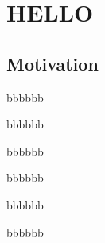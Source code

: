 \documentclass[11pt]{book}
\begin{document}
    \chapter{HELLO}


    \section{Motivation}
    \lipsum
    \begin{theorem}
    \end{theorem}

    \begin{corollary}
    \end{corollary}

    \begin{proposition}
        bbbbbb
    \end{proposition}

    \begin{conjecture}
        bbbbbb
    \end{conjecture}

    \begin{lemma}
        bbbbbb
    \end{lemma}

    \begin{definition}
        bbbbbb
    \end{definition}

    \begin{remark}
        bbbbbb
    \end{remark}

    \begin{assumption}
        bbbbbb
    \end{assumption}






    \cleardoublepage%
    \appendix
    \pagestyle{back} %
    \backmatter


    \printbibliography[category=cited]%
    \printbibliography[title={Further Reading},notcategory=cited]
    \nocite{*}


    \listoffigures

    \tableofcontents%
\end{document}
